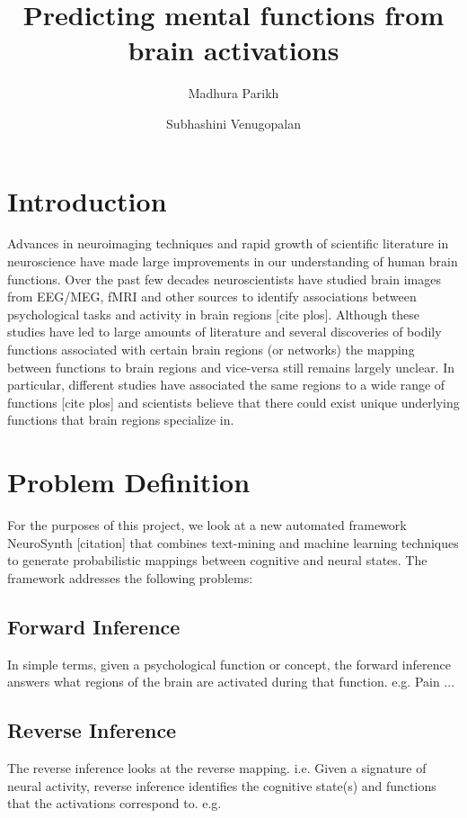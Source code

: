 \documentclass[11pt]{article}
\title{\bf Predicting mental functions from brain activations}
\author{ Madhura Parikh \and Subhashini Venugopalan}
\begin{document}
\date{}
\maketitle

\section{Introduction}

Advances in neuroimaging techniques and rapid growth of scientific literature in neuroscience have made large improvements  in our understanding of human brain functions. 
Over the past few decades neuroscientists have studied brain images from EEG/MEG, fMRI and other sources to identify associations between psychological tasks and activity in brain regions [cite plos].
Although these studies have led to large amounts of literature and several discoveries of bodily functions associated with certain brain regions (or networks) the mapping between functions to brain regions and vice-versa still remains largely unclear. In particular, different studies have associated the same regions to a wide range of functions [cite plos] and scientists believe that there could exist unique underlying functions that brain regions specialize in. 

\section{Problem Definition}
For the purposes of this project, we look at a new automated framework NeuroSynth [citation] that combines text-mining and machine learning techniques to generate probabilistic mappings between cognitive and neural states. The framework addresses the following problems:
\subsection{Forward Inference}
  In simple terms, given a psychological function or concept, the forward inference answers what regions of the brain are activated during that function. e.g. Pain ...
\subsection{Reverse Inference}
  The reverse inference looks at the reverse mapping. i.e. Given a signature of neural activity, reverse inference identifies the cognitive state(s) and functions that the activations correspond to. e.g.
\end{document}
